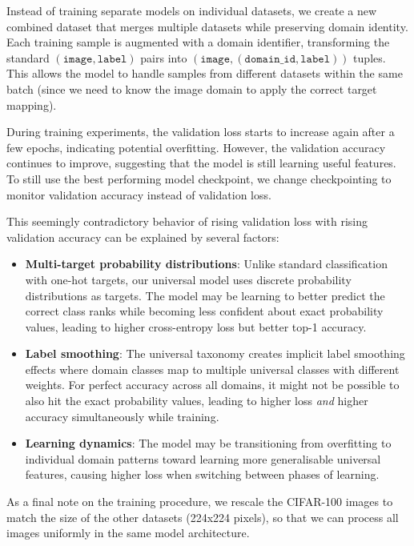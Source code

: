 Instead of training separate models on individual datasets,
we create a new combined dataset that merges multiple datasets while preserving domain identity.
Each training sample is augmented with a domain identifier,
transforming the standard $(\texttt{image}, \texttt{label})$ pairs into $(\texttt{image}, (\texttt{domain\_id}, \texttt{label}))$ tuples.
This allows the model to handle samples from different datasets within the same batch
(since we need to know the image domain to apply the correct target mapping).

During training experiments, the validation loss starts to increase again after a few epochs, indicating potential overfitting.
However, the validation accuracy continues to improve, suggesting that the model is still learning useful features.
To still use the best performing model checkpoint, we change checkpointing to monitor validation accuracy instead of validation loss.

This seemingly contradictory behavior of rising validation loss with rising validation accuracy can be explained by several factors:

\begin{itemize}
      \item \textbf{Multi-target probability distributions}: Unlike standard classification with one-hot targets,
            our universal model uses discrete probability distributions as targets.
            The model may be learning to better predict the correct class ranks while becoming less confident about exact probability values,
            leading to higher cross-entropy loss but better top-1 accuracy.
      \item \textbf{Label smoothing}: The universal taxonomy creates implicit
            label smoothing effects where domain classes map to multiple universal classes
            with different weights.
            For perfect accuracy across all domains, it might not be possible to also hit
            the exact probability values, leading to higher loss \textit{and} higher accuracy simultaneously
            while training.
      \item \textbf{Learning dynamics}: The model may be transitioning
            from overfitting to individual domain patterns toward learning more generalisable
            universal features, causing higher loss when switching between phases of learning.
\end{itemize}

As a final note on the training procedure,
we rescale the CIFAR-100 images to match the size of the other datasets (224x224 pixels),
so that we can process all images uniformly in the same model architecture.

